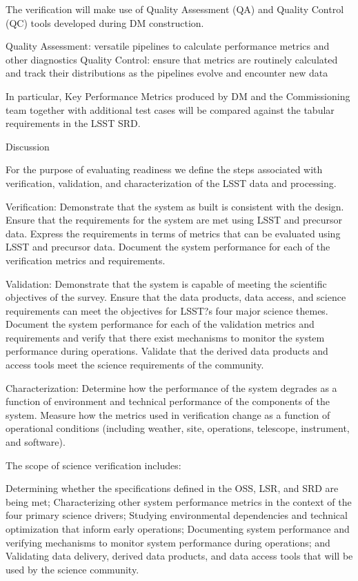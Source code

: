 The verification will make use of Quality Assessment (QA) and Quality Control (QC) tools developed during DM construction.

    Quality Assessment: versatile pipelines to calculate performance metrics and other diagnostics
    Quality Control: ensure that metrics are routinely calculated and track their distributions as the pipelines evolve and encounter new data

In particular, Key Performance Metrics produced by DM and the Commissioning team together with additional test cases will be compared against the tabular requirements in the LSST SRD. 

Discussion

For the purpose of evaluating readiness we define the steps associated with verification, validation, and characterization of the LSST data and processing.

Verification: Demonstrate that the system as built is consistent with the design. Ensure that the requirements for the system are met using LSST and precursor data. Express the requirements in terms of metrics that can be evaluated using LSST and precursor data. Document the system performance for each of the verification metrics and requirements.

Validation: Demonstrate that the system is capable of meeting the scientific objectives of the survey. Ensure that the data products, data access, and science requirements can meet the objectives for LSST?s four major science themes. Document the system performance for each of the validation metrics and requirements and verify that there exist mechanisms to monitor the system performance during operations. Validate that the derived data products and access tools meet the science requirements of the community.

Characterization: Determine how the performance of the system degrades as a function of environment and technical performance of the components of the system. Measure how the metrics used in verification change as a function of operational conditions (including weather, site, operations, telescope, instrument, and software).

The scope of science verification includes:

    Determining whether the specifications defined in the OSS, LSR, and SRD are being met;
    Characterizing other system performance metrics in the context of the four primary science drivers;
    Studying environmental dependencies and technical optimization that inform early operations;
    Documenting system performance and verifying mechanisms to monitor system performance during operations; and
    Validating data delivery, derived data products, and data access tools that will be used by the science community.

